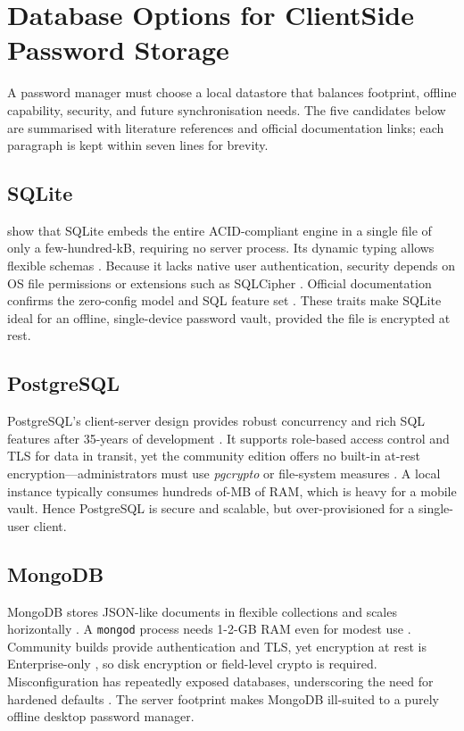 \section{Database Options for Client\textendash Side Password Storage}
\label{sec:db-options}

A password manager must choose a local datastore that balances footprint,
offline capability, security, and future synchronisation needs.  The five
candidates below are summarised with literature references and official
documentation links; each paragraph is kept within seven lines for brevity.

\subsection*{SQLite}
\textcite{Gaffney2022} show that SQLite embeds the entire ACID-compliant
engine in a single file of only a few-hundred-kB, requiring no server
process.  Its dynamic typing allows flexible schemas \autocite{Corovcak2025}.
Because it lacks native user authentication, security depends on OS file
permissions or extensions such as SQLCipher \autocite{Corovcak2025}.
Official documentation confirms the zero-config model and SQL feature set
\autocite{sqlLiteDoc2025}.  These traits make SQLite ideal for an offline,
single-device password vault, provided the file is encrypted at rest.

\subsection*{PostgreSQL}
PostgreSQL's client-server design provides robust concurrency and rich SQL
features after 35-years of development \autocite{Gkamas2022}.  It supports
role-based access control and TLS for data in transit, yet the community
edition offers no built-in at-rest encryption—administrators must use
\textit{pgcrypto} or file-system measures \autocite{Crunchy2024,
PostgreSQL2025}.  A local instance typically consumes hundreds of-MB of RAM,
which is heavy for a mobile vault.  Hence PostgreSQL is secure and scalable,
but over-provisioned for a single-user client.

\subsection*{MongoDB}
MongoDB stores JSON-like documents in flexible collections and scales
horizontally \autocite{Miryala2024}.  A \texttt{mongod} process needs 1-2-GB
RAM even for modest use \autocite{Dahunsi2021}.  Community builds provide
authentication and TLS, yet encryption at rest is Enterprise-only
\autocite{PrismaMongoEnc, MongoDB2025}, so disk encryption or field-level
crypto is required.  Misconfiguration has repeatedly exposed databases,
underscoring the need for hardened defaults \autocite{SqlLite2025}.  The
server footprint makes MongoDB ill-suited to a purely offline desktop
password manager.

